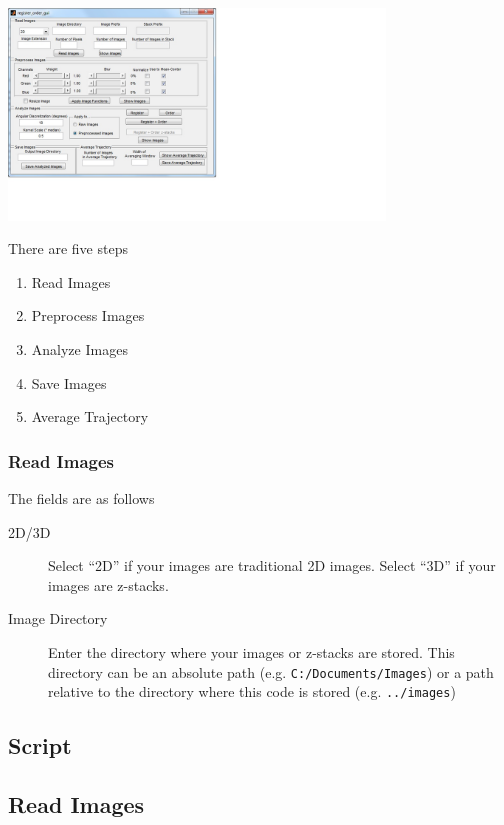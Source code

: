 \documentclass[12pt]{article}
\begin{document}
\includegraphics[width=10cm, trim=0cm 2cm 5cm 0cm, clip]{gui_screenshot_initial.jpg}

There are five steps
%
\begin{enumerate}
\item Read Images
\item Preprocess Images
\item Analyze Images
\item Save Images
\item Average Trajectory
\end{enumerate}

\subsubsection{Read Images}

The fields are as follows
\begin{description}
\item[2D/3D] Select ``2D'' if your images are traditional 2D images. Select ``3D'' if your images are z-stacks.
%
\item[Image Directory] Enter the directory where your images or z-stacks are stored. This directory can be an absolute path (e.g. \texttt{C:/Documents/Images}) or a path relative to the directory where this code is stored (e.g. \texttt{../images})
%
\end{description}
\subsection{Script}

\subsection*{Read Images}
\end{document}

